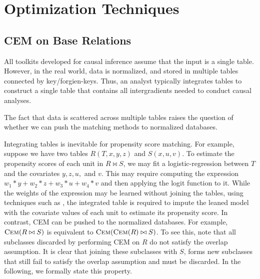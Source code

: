 


\section{Optimization Techniques}
\label{sec:OptimizationTechniques}



\vspace{-.2cm}
\subsection{CEM on Base Relations}
\label{sec:baserel}

All toolkits developed for causal inference
assume that the input is a single table. However, in the real world, data is normalized, and stored in multiple tables
connected by key/forgien-keys. Thus, an analyst typically integrates tables
to construct a single table that contains all intergradients needed to conduct causal analyses.  The fact that  data is scattered across multiple tables raises the question of whether we
can  push the matching methods to normalized databases. 


Integrating tables is inevitable for propensity score matching. For example, suppose we have two tables
$R(T,x,y,z)$ and $S(x,u,v)$. To estimate the propensity scores of each unit in $R \bowtie S$, we may fit
a logistic-regression between $T$ and  the covariates $y,z,u,$ and $v$. This may require computing the expression $w_1*y + w_2*z + w_3*u + w_4*v$ and then applying the logit function to it.  While the weights of the expression may be learned without joining the tables, using techniques such as \cite{schleich2016learning}, the integrated table is required to impute the leaned model with the covariate values of each unit to estimate its propensity score. In contrast,  CEM can be pushed
to the normalized databases. For example, ${\textsc{Cem}}(R \bowtie S)$ is equivalent to ${\textsc{Cem}}({\textsc{Cem}}(R)\bowtie S)$. To see this, note that all subclasses discarded by performing CEM on $R$ do not satisfy the overlap assumption. It is clear that joining these subclasses with $S$, forms new subclasses that still fail to satisfy the overlap assumption and must be discarded. In the following, we formally state this property.







